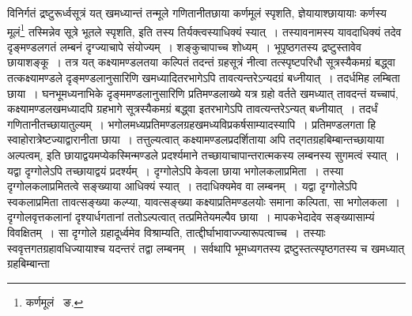 \documentclass[11pt, openany]{book}
\begin{document}
\noindent विनिर्गतं द्रष्टुरूर्ध्वसूत्रं यत् खमध्यान्तं तन्मूले गणितानीतछाया कर्णमूलं स्पृशति, ज्ञेयायाश्छायायाः कर्णस्य मूलं\renewcommand{\thefootnote}{१}\footnote{कर्णमूलं \textendash\ ङ.} तस्मिन्नेव सूत्रे भूतले स्पृशति, इति तस्य तिर्यक्त्वस्याधिक्यं स्यात्~। तस्यावनामस्य यावदाधिक्यं तदेव दृङ्मण्डलगतं लम्बनं दृग्ज्याचापे संयोज्यम्~। शङ्कुचापाच्च शोध्यम्~। भूपृष्ठगतस्य द्रष्टुस्तावेव छायाशङ्कू~। तत्र यत् कक्ष्यामण्डलतया कल्पितं तदन्तं ग्रहसूत्रं नीत्वा तत्स्पृष्टपरिधौ सूत्रस्यैकमग्रं बद्ध्वा तत्कक्ष्यामण्डले दृङ्मण्डलानुसारिणि खमध्यादितरभागेऽपि तावत्यन्तरेऽन्यदग्रं बध्नीयात्~। तदर्धमिह लम्बिता छाया~। घनभूमध्यनाभिके दृङ्ममण्डलानुसारिणि प्रतिमण्डलाख्ये यत्र ग्रहो वर्तते खमध्यात् तावदन्तं यच्चापं, कक्ष्यामण्डलखमध्यादपि ग्रहभागे सूत्रस्यैकमग्रं बद्ध्वा इतरभागेऽपि तावत्यन्तरेऽन्यत् बध्नीयात्~। तदर्धं गणितानीतच्छायातुल्यम्~। भगोलमध्यप्रतिमण्डलग्रहखमध्यविप्रकर्षसाम्यादस्यापि~। प्रतिमण्डलगता हि स्वाहोरात्रेष्टज्याद्वारानीता छाया~। तत्तुल्यत्वात् कक्ष्यामण्डलप्रदर्शिताया अपि तद्गतग्रहबिम्बान्तच्छायाया अल्पत्वम्, इति छायाद्वयमप्येकस्मिन्मण्डले प्रदर्श्यमाने तच्छायाचापान्तरात्मकस्य लम्बनस्य सुगमत्वं स्यात्~। यद्वा दृग्गोलेऽपि तच्छायाद्वयं प्रदर्श्यम्~। दृग्गोलेऽपि केवला छाया भगोलकलाप्रमिता~। तस्या दृग्गोलकलाप्रमितत्वे सङ्ख्याया आधिक्यं स्यात्~। तदाधिक्यमेव वा लम्बनम्~। यद्वा दृग्गोलेऽपि स्वकलाप्रमिता तावत्सङ्ख्या कल्प्या, यावत्सङ्ख्या कक्ष्याप्रतिमण्डलयोः समाना कल्पिता, सा भगोलकला~। दृग्गोलवृत्तकलानां दृश्यार्धगतानां ततोऽल्पत्वात् तत्प्रमितेयमल्पैव छाया~। मापकभेदादेव सङ्ख्यासाम्यं विवक्षितम्~। सा दृग्गोले ग्रहादूर्ध्वमेव विश्राम्यति, तात्द्दीर्घाभावाज्ज्यारूपत्वाच्च~। तस्याः स्ववृत्तगतग्रहावधिज्यायाश्च यदन्तरं तद्वा लम्बनम्~। सर्वथापि भूमध्यगतस्य द्रष्टुस्तत्स्पृष्ठगतस्य च खमध्यात् ग्रहबिम्बान्ता 

\newpage
\end{document}
